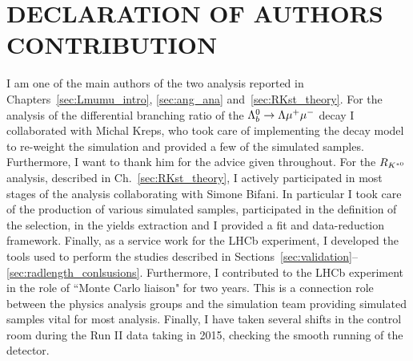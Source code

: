 \chapter*{DECLARATION OF AUTHORS CONTRIBUTION}
%
I am one of the main authors of the two analysis reported in Chapters~\ref{sec:Lmumu_intro},
\ref{sec:ang_ana} and~\ref{sec:RKst_theory}. For the analysis of the differential branching ratio 
of the $\Lambda^0_b\rightarrow\Lambda\mu^+\mu^-$ decay I collaborated with Michal Kreps, who took care of implementing the decay
model to re-weight the simulation and provided a few of the simulated samples. Furthermore, I want to thank him
for the advice given throughout. 
For the $R_{K^{*0}}$ analysis, described in Ch.~\ref{sec:RKst_theory}, I actively participated
in most stages of the analysis collaborating with Simone Bifani. In particular I took care of
the production of various simulated samples, participated in the definition of the selection,
in the yields extraction and I provided a fit and data-reduction framework.
Finally, as a service work for the LHCb experiment, I developed the tools used to perform
the studies described in Sections~\ref{sec:validation}--\ref{sec:radlength_conlsusions}.
Furthermore, I contributed to the LHCb experiment in the role of ``Monte Carlo liaison" for two years.
This is a connection role between the physics analysis groups and the simulation team providing
simulated samples vital for most analysis. Finally, I have taken several shifts in the control room 
during the Run II data taking in 2015, checking the smooth running of the detector.
%
\clearpage
